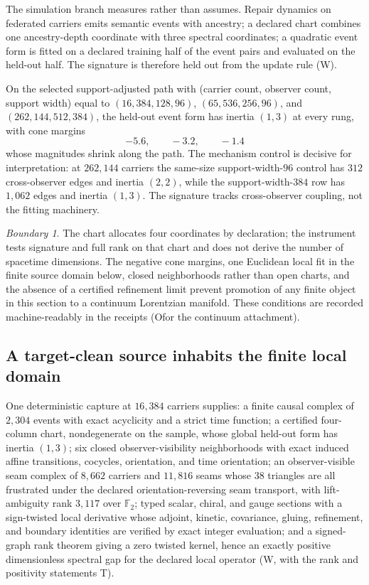 \documentclass[11pt]{article}
\theoremstyle{remark}
\newtheorem{boundary}[theorem]{Boundary}
\newcommand{\evT}{\textsf{T}}   %
\newcommand{\evW}{\textsf{W}}   %
\newcommand{\evO}{\textsf{O}}   %
\begin{document}
The simulation branch measures rather than assumes. Repair dynamics on
federated carriers emits semantic events with ancestry; a declared chart
combines one ancestry-depth coordinate with three spectral coordinates; a
quadratic event form is fitted on a declared training half of the event
pairs and evaluated on the held-out half. The signature is therefore held
out from the update rule (\evW).

On the selected support-adjusted path with (carrier count, observer count,
support width) equal to $(16{,}384,128,96)$, $(65{,}536,256,96)$, and
$(262{,}144,512,384)$, the held-out event form has inertia $(1,3)$ at every
rung, with cone margins
\begin{equation}
-5.6,\qquad -3.2,\qquad -1.4
\end{equation}
whose magnitudes shrink along the path. The mechanism control is decisive
for interpretation: at $262{,}144$ carriers the same-size support-width-$96$
control has $312$ cross-observer edges and inertia $(2,2)$, while the
support-width-$384$ row has $1{,}062$ edges and inertia $(1,3)$. The
signature tracks cross-observer coupling, not the fitting machinery.

\begin{boundary}
The chart allocates four coordinates by declaration; the instrument tests
signature and full rank on that chart and does not derive the number of
spacetime dimensions. The negative cone margins, one Euclidean local fit in
the finite source domain below, closed neighborhoods rather than open
charts, and the absence of a certified refinement limit prevent promotion of
any finite object in this section to a continuum Lorentzian manifold. These
conditions are recorded machine-readably in the receipts (\evO for the
continuum attachment).
\end{boundary}

\subsection{A target-clean source inhabits the finite local domain}

One deterministic capture at $16{,}384$ carriers supplies: a finite causal
complex of $2{,}304$ events with exact acyclicity and a strict time
function; a certified four-column chart, nondegenerate on the sample, whose
global held-out form has inertia $(1,3)$; six closed observer-visibility
neighborhoods with exact induced affine transitions, cocycles, orientation,
and time orientation; an observer-visible seam complex of $8{,}662$ carriers
and $11{,}816$ seams whose $38$ triangles are all frustrated under the
declared orientation-reversing seam transport, with lift-ambiguity rank
$3{,}117$ over $\mathbb F_{2}$; typed scalar, chiral, and gauge sections
with a sign-twisted local derivative whose adjoint, kinetic, covariance,
gluing, refinement, and boundary identities are verified by exact integer
evaluation; and a signed-graph rank theorem giving a zero twisted kernel,
hence an exactly positive dimensionless spectral gap for the declared local
operator (\evW, with the rank and positivity statements \evT).
\end{document}
